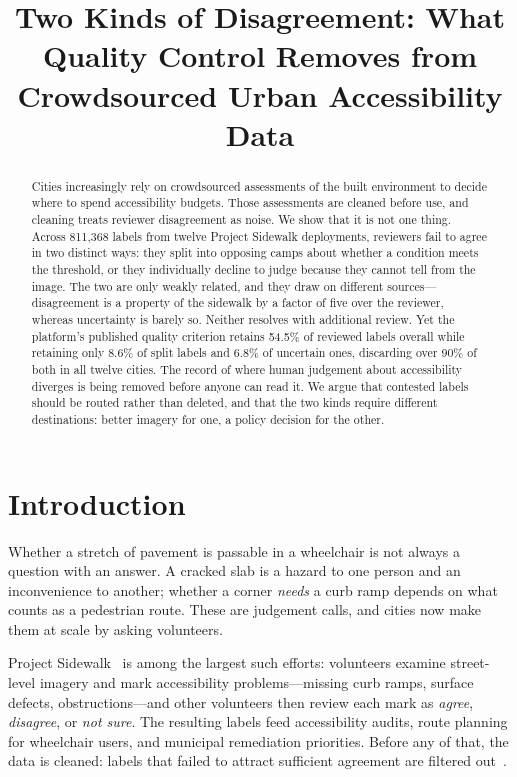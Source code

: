 
\title{Two Kinds of Disagreement: What Quality Control Removes from
Crowdsourced Urban Accessibility Data}

\begin{abstract}
Cities increasingly rely on crowdsourced assessments of the built environment to
decide where to spend accessibility budgets. Those assessments are cleaned
before use, and cleaning treats reviewer disagreement as noise. We show that it
is not one thing. Across 811{,}368 labels from twelve Project Sidewalk
deployments, reviewers fail to agree in two distinct ways: they split into
opposing camps about whether a condition meets the threshold, or they
individually decline to judge because they cannot tell from the image. The two
are only weakly related, and they draw on different sources---disagreement is a
property of the sidewalk by a factor of five over the reviewer, whereas
uncertainty is barely so. Neither resolves with additional review. Yet the
platform's published quality criterion retains 54.5\% of reviewed labels overall
while retaining only 8.6\% of split labels and 6.8\% of uncertain ones,
discarding over 90\% of both in all twelve cities. The record of where human
judgement about accessibility diverges is being removed before anyone can read
it. We argue that contested labels should be routed rather than deleted, and
that the two kinds require different destinations: better imagery for one, a
policy decision for the other.
\end{abstract}

\section{Introduction}

Whether a stretch of pavement is passable in a wheelchair is not always a
question with an answer. A cracked slab is a hazard to one person and an
inconvenience to another; whether a corner \emph{needs} a curb ramp depends on
what counts as a pedestrian route. These are judgement calls, and cities now
make them at scale by asking volunteers.

Project Sidewalk~\parencite{saha2019projectsidewalk} is among the largest such
efforts: volunteers examine street-level imagery and mark accessibility
problems---missing curb ramps, surface defects, obstructions---and other
volunteers then review each mark as \emph{agree}, \emph{disagree}, or
\emph{not sure}. The resulting labels feed accessibility audits, route planning
for wheelchair users, and municipal remediation priorities. Before any of that,
the data is cleaned: labels that failed to attract sufficient agreement are
filtered out~\parencite{li2024labelaid}.

